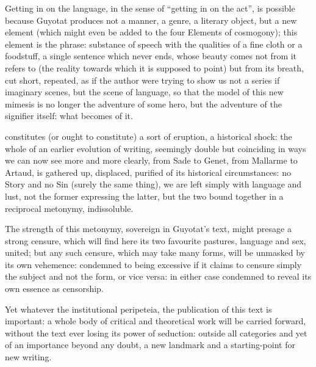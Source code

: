\documentclass[10pt,twoside]{memoir}
\begin{document}
Getting in on the language, in the sense of \enquote{getting in on the act}, is possible because
Guyotat produces not a manner, a genre, a literary object, but a new element (which might even be
added to the four Elements of cosmogony); this element is the phrase: substance of speech with the
qualities of a fine cloth or a foodstuff, a single sentence which never ends, whose beauty comes not
from it refers to (the reality towards which it is supposed to point) but from its breath, cut
short, repeated, as if the author were trying to show us not a series if imaginary scenes, but the
scene of language, so that the model of this new mimesis is no longer the adventure of some hero,
but the adventure of the signifier itself: what becomes of it.

 constitutes (or ought to constitute) a sort of eruption, a historical
shock: the whole of an earlier evolution of writing, seemingly double but coinciding in ways we can
now see more and more clearly, from Sade to Genet, from Mallarme to Artaud, is gathered up,
displaced, purified of its historical circumstances: no Story and no Sin (surely the same thing), we
are left simply with language and lust, not the former expressing the latter, but the two bound
together in a reciprocal metonymy, indissoluble.

The strength of this metonymy, sovereign in Guyotat's text, might presage a strong censure, which
will find here its two favourite pastures, language and sex, united; but any such censure, which may
take many forms, will be unmasked by its own vehemence: condemned to being excessive if it claims to
censure simply the subject and not the form, or vice versa: in either case condemned to reveal its
own essence as censorship.

Yet whatever the institutional peripeteia, the publication of this text is important: a whole body
of critical and theoretical work will be carried forward, without the text ever losing its power of
seduction: outside all categories and yet of an importance beyond any doubt, a new landmark and a
starting-point for new writing.


\mainmatter

\clearpage
\pagestyle{simple}

\thispagestyle{empty}



\end{document}
